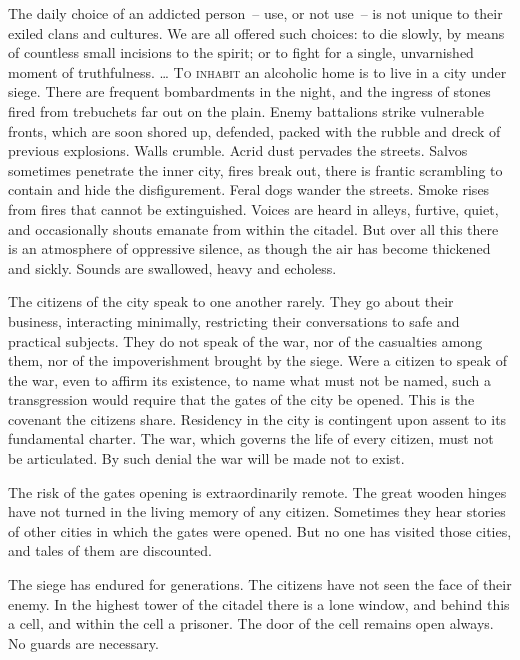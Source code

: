 \documentclass[10pt,DIV09,letterpaper,oneside,headsepline]{scrreprt}
\begin{document}
The daily choice of an addicted person~-- use, or not use~-- is not unique to their exiled clans and cultures. We are all offered such choices: to die slowly, by means of countless small incisions to the spirit; or to fight for a single, unvarnished moment of truthfulness.
\newpage
\ldots
\vspace{\baselineskip}
\lettrine[lhang=0.4, nindent=-2pt]{\textcolor[gray]{0.1}{T}}{o inhabit }
an alcoholic home is to live in a city under siege. There are frequent bombardments in the night, and the ingress of stones fired from trebuchets far out on the plain. Enemy battalions strike vulnerable fronts, which are soon shored up, defended, packed with the rubble and dreck of previous explosions. Walls crumble. Acrid dust pervades the streets. Salvos sometimes penetrate the inner city, fires break out, there is frantic scrambling to contain and hide the disfigurement. Feral dogs wander the streets. Smoke rises from fires that cannot be extinguished. Voices are heard in alleys, furtive, quiet, and occasionally shouts emanate from within the citadel. But over all this there is an atmosphere of oppressive silence, as though the air has become thickened and sickly. Sounds are swallowed, heavy and echoless.

The citizens of the city speak to one another rarely. They go about their business, interacting minimally, restricting their conversations to safe and practical subjects. They do not speak of the war, nor of the casualties among them, nor of the impoverishment brought by the siege. Were a citizen to speak of the war, even to affirm its existence, to name what must not be named, such a transgression would require that the gates of the city be opened. This is the covenant the citizens share. Residency in the city is contingent upon assent to its fundamental charter. The war, which governs the life of every citizen, must not be articulated. By such denial the war will be made not to exist.

The risk of the gates opening is extraordinarily remote. The great wooden hinges have not turned in the living memory of any citizen. Sometimes they hear stories of other cities in which the gates were opened. But no one has visited those cities, and tales of them are discounted.

The siege has endured for generations. The citizens have not seen the face of their enemy. In the highest tower of the citadel there is a lone window, and behind this a cell, and within the cell a prisoner. The door of the cell remains open always. No guards are necessary.
\end{document}
